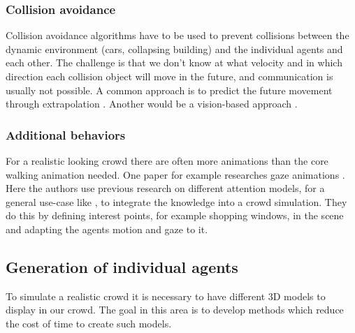 \documentclass{acmsiggraph}               %
\begin{document}
\subsubsection{Collision avoidance}
Collision avoidance algorithms have to be used to prevent collisions between the dynamic environment (cars, collapsing building) and the individual agents and each other. The challenge is that we don't know at what velocity and in which direction each collision object will move in the future, and communication is usually not possible. 
A common approach is to predict the future movement through extrapolation \cite{karamouzas_predictive_2009}. Another would be a vision-based approach \cite{ondrej_synthetic-vision_2010}.

\subsubsection{Additional behaviors}
For a realistic looking crowd there are often more animations than the core walking animation needed. One paper for example researches gaze animations \cite{grillon_simulating_2009}. 
Here the authors use previous research on different attention models, for a general use-case like \cite{peters_model_2005}, to integrate the knowledge into a crowd simulation. They do this by defining interest points, for example shopping windows, in the scene and adapting the agents motion and gaze to it. 

\subsection{Generation of individual agents}
To simulate a realistic crowd it is necessary to have different 3D models to display in our crowd. The goal in this area is to develop methods which reduce the cost of time to create such models. 
\end{document}
